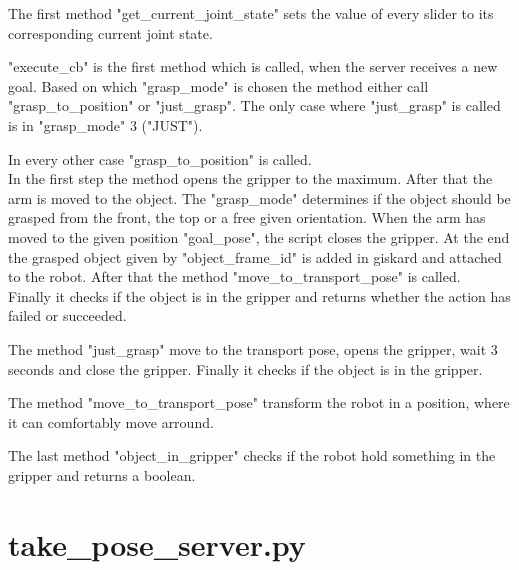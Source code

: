 \documentclass[main.tex]{subfiles}
\begin{document}
			 \vspace{0,75 cm}
			 The first method "get\_current\_joint\_state"  sets the value of every slider to its corresponding current joint state.
			 
			 \vspace{0,25 cm}
			 "execute\_cb" is the first method which is called, when the server receives a new goal. Based on which "grasp\_mode" is chosen the method either call "grasp\_to\_position" or "just\_grasp". The only case where "just\_grasp" is called is in "grasp\_mode" 3 ("JUST").
			 
			 \vspace{0,25 cm}
			 In every other case "grasp\_to\_position" is called.\\
			In the first step the method opens the gripper to the maximum. After that the arm is moved to the object. The "grasp\_mode" determines if the object should be grasped from the front, the top or a free given orientation. When the arm has moved to the given position "goal\_pose", the script closes the gripper. At the end the grasped object given by "object\_frame\_id" is added in giskard and attached to the robot. After that the method "move\_to\_transport\_pose" is called.\\
			Finally it checks if the object is in the gripper and returns whether the action has failed or succeeded.
			
			\vspace{0,25 cm}
			The method "just\_grasp" move to the transport pose, opens the gripper, wait 3 seconds and close the gripper. Finally it checks if the object is in the gripper.
			
			\vspace{0,25 cm}
			The method "move\_to\_transport\_pose" transform the robot in a position, where it can comfortably move arround.
			
			\vspace{0,25 cm}
			The last method "object\_in\_gripper" checks if the robot hold something in the gripper and returns a boolean.\\
			
			\section{take\_pose\_server.py} 
			
\end{document}
